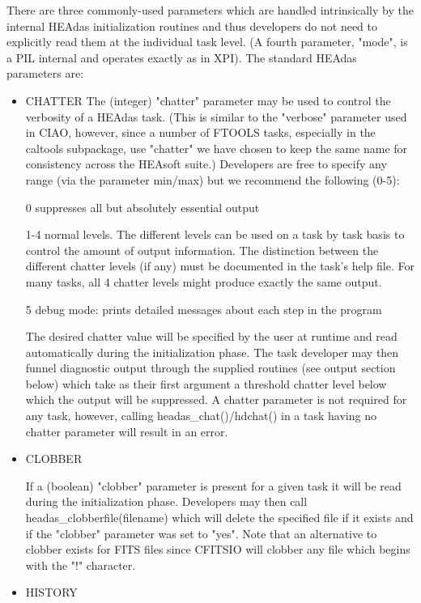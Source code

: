 \documentclass[11pt]{book}
\begin{document}
There are three commonly-used parameters which are handled
intrinsically by the internal HEAdas initialization routines and thus
developers do not need to explicitly read them at the individual
task level. (A fourth parameter, "mode", is a PIL internal and
operates exactly as in XPI). The standard HEAdas parameters
are:

\begin{itemize}
\item CHATTER
The (integer) "chatter" parameter may be used to control
the verbosity of a HEAdas task. (This is similar to the
"verbose" parameter used in CIAO, however, since a
number of FTOOLS tasks, especially in the caltools
subpackage, use "chatter" we have chosen to keep the
same name for consistency across the HEAsoft suite.)
Developers are free to specify any range (via the
parameter min/max) but we recommend the following
(0-5):

0 suppresses all but absolutely essential output

1-4 normal levels. The different levels can be used
on a task by task basis to control the amount of
output information. The distinction between the
different chatter levels (if any) must be documented
in the task's help file. For many tasks, all 4 chatter
levels might produce exactly the same output.

5 debug mode: prints detailed messages about each
step in the program

The desired chatter value will be specified by the user at
runtime and read automatically during the initialization
phase. The task developer may then funnel diagnostic
output through the supplied routines (see output section
below) which take as their first argument a threshold
chatter level below which the output will be suppressed. A
chatter parameter is not required for any task, however,
calling headas\_chat()/hdchat() in a task having no
chatter parameter will result in an error.

\item CLOBBER

If a (boolean) "clobber" parameter is present for a given
task it will be read during the initialization phase.
Developers may then call headas\_clobberfile(filename)
which will delete the specified file if it exists and if the
"clobber" parameter was set to "yes". Note that an
alternative to clobber exists for FITS files since CFITSIO
will clobber any file which begins with the "!" character.

\item HISTORY


\end{itemize}
\end{document}
